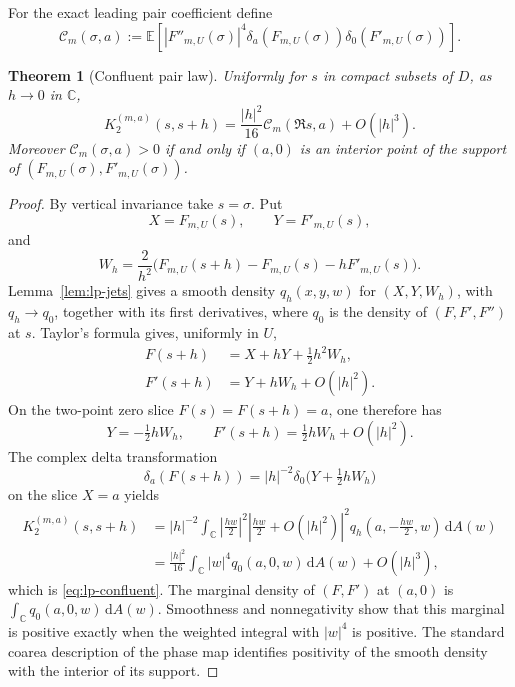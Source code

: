 \documentclass[11pt]{article}
\newtheorem{theorem}{Theorem}[section]
\theoremstyle{definition}
\theoremstyle{remark}
\newcommand{\dd}{\,\mathrm d}
\newcommand{\C}{\mathbb C}
\begin{document}
For the exact leading pair coefficient define
\begin{equation}
 \mathcal C_m(\sigma,a)
 :={\mathbb E}\!\left[
 |F''_{m,U}(\sigma)|^4
 \delta_a(F_{m,U}(\sigma))
 \delta_0(F'_{m,U}(\sigma))
 \right].
 \label{eq:lp-confluent-C}
\end{equation}

\begin{theorem}[Confluent pair law]
\label{thm:lp-confluent}
Uniformly for $s$ in compact subsets of $D$, as $h\to0$ in $\C$,
\begin{equation}
 \boxed{
 K_2^{(m,a)}(s,s+h)
 =\frac{|h|^2}{16}\mathcal C_m(\Re s,a)+O(|h|^3).
 }
 \label{eq:lp-confluent}
\end{equation}
Moreover $\mathcal C_m(\sigma,a)>0$ if and only if $(a,0)$ is an interior
point of the support of $(F_{m,U}(\sigma),F'_{m,U}(\sigma))$.
\end{theorem}

\begin{proof}
By vertical invariance take $s=\sigma$.  Put
\[
 X=F_{m,U}(s),\qquad Y=F'_{m,U}(s),
\]
and
\[
 W_h=\frac2{h^2}\bigl(F_{m,U}(s+h)-F_{m,U}(s)-hF'_{m,U}(s)\bigr).
\]
Lemma~\ref{lem:lp-jets} gives a smooth density $q_h(x,y,w)$ for $(X,Y,W_h)$,
with $q_h\to q_0$, together with its first derivatives, where $q_0$ is the
density of $(F,F',F'')$ at $s$.  Taylor's formula gives, uniformly in $U$,
\begin{align*}
 F(s+h)&=X+hY+\tfrac12h^2W_h,\\
 F'(s+h)&=Y+hW_h+O(|h|^2).
\end{align*}
On the two-point zero slice $F(s)=F(s+h)=a$, one therefore has
\[
 Y=-\tfrac12hW_h,
 \qquad
 F'(s+h)=\tfrac12hW_h+O(|h|^2).
\]
The complex delta transformation
\[
 \delta_a(F(s+h))
 =|h|^{-2}\delta_0\bigl(Y+\tfrac12hW_h\bigr)
\]
on the slice $X=a$ yields
\begin{align*}
 K_2^{(m,a)}(s,s+h)
 &=|h|^{-2}\int_\C
   \left|\frac{hw}{2}\right|^2
   \left|\frac{hw}{2}+O(|h|^2)\right|^2
   q_h\left(a,-\frac{hw}{2},w\right)\dd A(w)\\
 &=\frac{|h|^2}{16}\int_\C|w|^4q_0(a,0,w)\dd A(w)
   +O(|h|^3),
\end{align*}
which is \eqref{eq:lp-confluent}.  The marginal density of $(F,F')$ at
$(a,0)$ is $\int_\C q_0(a,0,w)\dd A(w)$.  Smoothness and nonnegativity show
that this marginal is positive exactly when the weighted integral with
$|w|^4$ is positive.  The standard coarea description of the phase map
identifies positivity of the smooth density with the interior of its support.
\end{proof}
\end{document}
